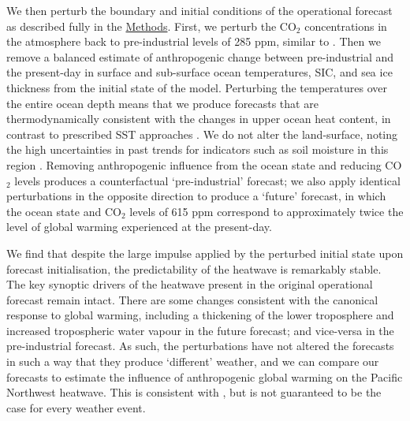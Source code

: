   We then perturb the boundary and initial conditions of the operational forecast as described fully in the \hyperref[ch4:methods]{Methods}. First, we perturb the CO$_2$ concentrations in the atmosphere back to pre-industrial levels of 285 ppm, similar to \citet{leach_forecast-based_2021}. Then we remove a balanced estimate of anthropogenic change between pre-industrial and the present-day in surface and sub-surface ocean temperatures, SIC, and sea ice thickness \cite{locarnini_world_2019,rayner_global_2003,zuo_ecmwf_2019} from the initial state of the model. Perturbing the temperatures over the entire ocean depth means that we produce forecasts that are thermodynamically consistent with the changes in upper ocean heat content, in contrast to prescribed SST approaches \cite{massey_weatherhome-development_2015,ciavarella_upgrade_2018}. We do not alter the land-surface, noting the high uncertainties in past trends for indicators such as soil moisture in this region \cite{masson-delmotte_water_2021,masson-delmotte_changing_2021,masson-delmotte_atlas_2021}. Removing anthropogenic influence from the ocean state and reducing CO$_2$ levels produces a counterfactual `pre-industrial' forecast; we also apply identical perturbations in the opposite direction to produce a `future' forecast, in which the ocean state and CO$_2$ levels of 615 ppm correspond to approximately twice the level of global warming experienced at the present-day.

  We find that despite the large impulse applied by the perturbed initial state upon forecast initialisation, the predictability of the heatwave is remarkably stable. The key synoptic drivers of the heatwave present in the original operational forecast remain intact. There are some changes consistent with the canonical response to global warming, including a thickening of the lower troposphere \cite{christidis_changes_2015} and increased tropospheric water vapour \cite{allen_constraints_2002} in the future forecast; and vice-versa in the pre-industrial forecast. As such, the perturbations have not altered the forecasts in such a way that they produce `different' weather, and we can compare our forecasts to estimate the influence of anthropogenic global warming on the Pacific Northwest heatwave. This is consistent with \citet{leach_forecast-based_2021}, but is not guaranteed to be the case for every weather event.

